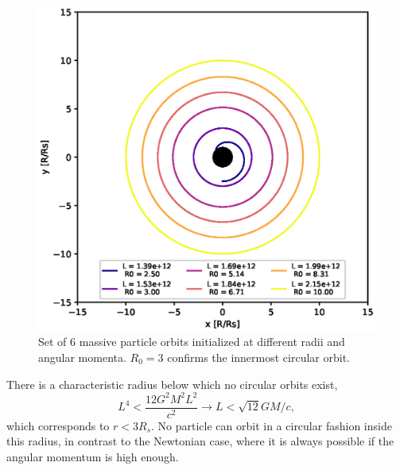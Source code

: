 \documentclass[journal, a4paper]{IEEEtran}
\begin{document}
\begin{figure}[!hbt]
	\begin{center}
	\includegraphics[width=\columnwidth]{massive_geodesics.eps}
	\caption{Set of 6 massive particle orbits initialized at different radii and angular momenta. $R_0=3$ confirms the innermost circular orbit.}
	\label{fig::massive_geodesics}
\end{center}
\end{figure}

There is a characteristic radius below which no circular orbits exist, 
\begin{equation}
	L^4 < \frac{ 12 G^2 M^2 L^2}{ c^2} \rightarrow L < \sqrt{12 } G M /c,
\end{equation}
which corresponds to $r<3 R_s$. No particle can orbit in a circular fashion inside this radius, in contrast to the Newtonian case, where it is always possible if the angular momentum is high enough.
\end{document}
